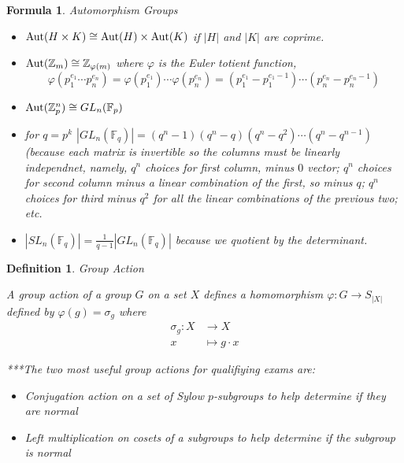 \documentclass[12pt]{Qual}
\newtheorem{formula}{Formula}
\newtheorem{definition}{Definition}
\begin{document}
\vspace{0.5cm}
\begin{formula}{\Large\textit{Automorphism Groups}}

\begin{itemize}
\renewcommand\labelitemi{\faBug}
    \item $\text{Aut}(H\times K)\cong\text{Aut}(H)\times\text{Aut}(K)$ if $|H|$ and $|K|$ are coprime.
    \item $\text{Aut}(\mathbb{Z}_m)\cong\mathbb{Z}_{\varphi(m)}$ where $\varphi$ is the Euler totient function, $$\varphi(p_1^{e_1}\cdots p_n^{e_n})=\varphi(p_1^{e_1})\cdots\varphi(p_n^{e_n})=(p_1^{e_1}-p_1^{e_1-1})\cdots(p_n^{e_n}-p_n^{e_n-1})$$
    \item $\text{Aut}(\mathbb{Z}_p^n)\cong GL_n(\mathbb{F}_p)$
    \item for $q=p^k$ $|GL_n(\mathbb{F}_q)|=(q^n-1)(q^n-q)(q^n-q^2)\cdots(q^n-q^{n-1})$ (because each matrix is invertible so the columns must be linearly independnet, namely, $q^n$ choices for first column, minus $0$ vector; $q^n$ choices for second column minus a linear combination of the first, so minus $q$; $q^n$ choices for third minus $q^2$ for all the linear combinations of the previous two; etc.
    \item $|SL_n(\mathbb{F}_q)|=\frac{1}{q-1}|GL_n(\mathbb{F}_q)|$ because we quotient by the determinant.
\end{itemize}

\end{formula}
\vspace{0.5cm}
\begin{definition}{\Large\textit{Group Action}}

A group action of a group $G$ on a set $X$ defines a homomorphism $\varphi:G\to S_{|X|}$ defined by $\varphi(g)=\sigma_g$ where \begin{align*}
    \sigma_g:X&\to X\\
    x&\mapsto g\cdot x
\end{align*}

\begin{mybox}
***The two most useful group actions for qualifiying exams are:
\begin{itemize}
\renewcommand\labelitemi{\faCoffee}
    \item Conjugation action on a set of Sylow $p$-subgroups to help determine if they are normal
    \item Left multiplication on cosets of a subgroups to help determine if the subgroup is normal
\end{itemize}
\end{mybox}

\end{definition}
\end{document}
